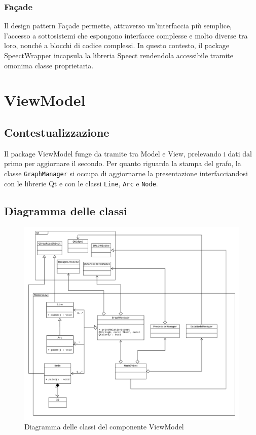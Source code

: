 \documentclass[openany,12pt,a4paper]{report}
\begin{document}
	\subsubsection{Façade} 
	Il design pattern Façade permette, attraverso un'interfaccia più semplice, l'accesso a sottosistemi che espongono interfacce complesse e molto diverse tra loro, nonché a blocchi di codice complessi. In questo contesto, il package SpeectWrapper incapsula la libreria Speect rendendola accessibile tramite omonima classe proprietaria.
	
	\newpage
	
	\section{ViewModel}
	
	\subsection{Contestualizzazione}
	Il package ViewModel funge da tramite tra Model e View, prelevando i dati dal primo per aggiornare il secondo. Per quanto riguarda la stampa del grafo, la classe \verb|GraphManager| si occupa di aggiornarne la presentazione interfacciandosi con le librerie Qt e con le classi \verb|Line|, \verb|Arc| e \verb|Node|.  
	
	\subsection{Diagramma delle classi}
		
	\begin{figure}[H]
		\includegraphics[scale=0.5]{ViewModelDiagram}
		\centering
		\caption{Diagramma delle classi del componente ViewModel}
	\end{figure}
\end{document}
